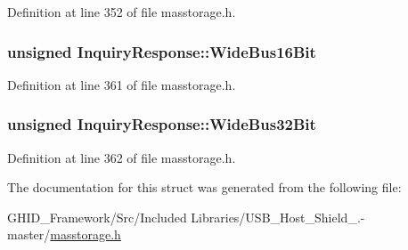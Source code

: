 \-Definition at line 352 of file masstorage.\-h.

\hypertarget{struct_inquiry_response_a39a63fd0fd92c50370af9aefe93c13cf}{
\subsubsection[{\-Wide\-Bus16\-Bit}]{\setlength{\rightskip}{0pt plus 5cm}unsigned {\bf \-Inquiry\-Response\-::\-Wide\-Bus16\-Bit}}}\label{struct_inquiry_response_a39a63fd0fd92c50370af9aefe93c13cf}


\-Definition at line 361 of file masstorage.\-h.

\hypertarget{struct_inquiry_response_a78c6cf3387430de8176b006c4915be63}{
\subsubsection[{\-Wide\-Bus32\-Bit}]{\setlength{\rightskip}{0pt plus 5cm}unsigned {\bf \-Inquiry\-Response\-::\-Wide\-Bus32\-Bit}}}\label{struct_inquiry_response_a78c6cf3387430de8176b006c4915be63}


\-Definition at line 362 of file masstorage.\-h.



\-The documentation for this struct was generated from the following file\-:\begin{DoxyCompactItemize}
\item 
\-G\-H\-I\-D\-\_\-\-Framework/\-Src/\-Included Libraries/\-U\-S\-B\-\_\-\-Host\-\_\-\-Shield\-\_.-\/master/\hyperlink{masstorage_8h}{masstorage.\-h}\end{DoxyCompactItemize}
